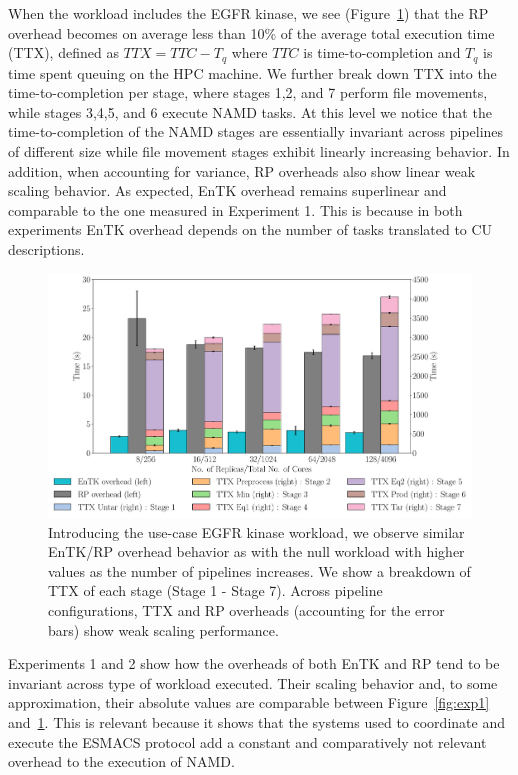 When the workload includes the EGFR kinase, we see (Figure~\ref{fig:exp2}) that the
RP overhead becomes on average less than 10\% of the average total execution
time (TTX), defined as \(TTX = TTC - T_q\) where \(TTC\) is
time-to-completion and \(T_q\) is time spent queuing on the HPC machine. We further break down TTX into the time-to-completion per stage, where stages 1,2, and 7 perform file movements, while stages 3,4,5, and 6 execute NAMD tasks. At this level we notice that the time-to-completion of the NAMD stages are essentially invariant across pipelines of different size while file movement stages exhibit linearly increasing behavior. In addition, when accounting for variance, RP overheads also show linear weak scaling behavior. 
As expected, EnTK overhead remains superlinear and
comparable to the one measured in Experiment 1. This is because in both
experiments EnTK overhead depends on the number of tasks translated to CU
descriptions.

\begin{figure}
  \centering
  \includegraphics[width=\columnwidth]{esmacs_32.pdf}
  \caption{Introducing the use-case EGFR kinase workload, we observe
  similar EnTK/RP overhead behavior as with the null workload with higher
  values as the number of pipelines increases. We show a breakdown of TTX of 
  each stage (Stage 1 - Stage 7). Across pipeline configurations, TTX and RP overheads 
  (accounting for the error bars) show
  weak scaling performance.}\label{fig:exp2}
\end{figure}

Experiments 1 and 2 show how the overheads of both EnTK and RP tend to be
invariant across type of workload executed. Their scaling behavior and, to
some approximation, their absolute values are comparable between
Figure~\ref{fig:exp1} and~\ref{fig:exp2}. This is relevant because it shows
that the systems used to coordinate and execute the ESMACS protocol add a
constant and comparatively not relevant overhead to the execution of NAMD\@.
